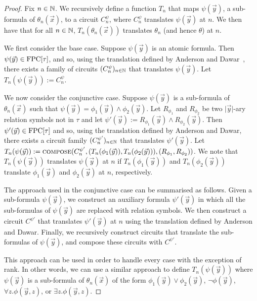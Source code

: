 \documentclass[../paper.tex]{subfiles}
\begin{document}
\begin{proof}
  Fix $n \in \mathbb{N}$. We recursively define a function $T_n$ that maps $\psi
  (\vec{y})$, a sub-formula of $\theta_n(\vec{x})$, to a circuit $C^{\psi}_n$,
  where $C^{\psi}_n$ translates $\psi(\vec{y})$ at $n$. We then have that for
  all $n \in \mathbb{N}$, $T_n(\theta_n(\vec{x}))$ translates $\theta_n$ (and hence
  $\theta$) at $n$.

  
  

  We first consider the base case. Suppose $\psi(\vec{y})$ is an atomic formula.
  Then $\psi(\vec{y}) \in \text{\upshape FPC}[\tau]$, and so, using the translation defined by
  Anderson and Dawar~\cite{AndersonD17}, there exists a family of circuits
  $(C^{\psi}_n)_{n \in \mathbb{N}}$ that translates $\psi(\vec{y})$. Let
  $T_n(\psi(\vec{y})) := C^{\psi}_n$.

  We now consider the conjunctive case. Suppose $\psi(\vec{y})$ is a sub-formula
  of $\theta_n(\vec{x})$ such that $\psi (\vec{y}) = \phi_1(\vec{y}) \land
  \phi_2(\vec{y})$. Let $R_{\phi_1}$ and $R_{\phi_2}$ be two $\vert \vec{y}
  \vert$-ary relation symbols not in $\tau$ and let $\psi' (\vec{y}) :=
  R_{\phi_1}(\vec{y}) \land R_{\phi_2}(\vec{y})$. Then $\psi'(\vec{y}) \in
  \text{\upshape FPC}[\tau]$ and so, using the translation defined by Anderson and Dawar, there
  exists a circuit family $(C^{\psi'}_n)_{n \in \mathbb{N}}$ that translates
  $\psi'(\vec{y})$. Let $T_n(\psi (\vec{y})) := {\normalfont\textsc{compose}}(C^{\psi'}_n, (
  T_n(\phi_1(\vec{y})), T_n(\phi_2(\vec{y}))), (R_{\phi_1}, R_{\phi_2}))$. We
  note that $T_n(\psi(\vec{y}))$ translates $\psi (\vec{y})$ at $n$ if
  $T_n(\phi_1 (\vec{y}))$ and $T_n(\phi_2(\vec{y}))$ translate $\phi_1(\vec{y})$
  and $\phi_2(\vec{y})$ at $n$, respectively.

  The approach used in the conjunctive case can be summarised as follows. Given
  a sub-formula $\psi (\vec{y})$, we construct an auxiliary formula
  $\psi'(\vec{y})$ in which all the sub-formulas of $\psi(\vec{y})$ are replaced
  with relation symbols. We then construct a circuit $C^{\psi'}$ that translates
  $\psi'(\vec{y})$ at $n$ using the translation defined by Anderson and Dawar.
  Finally, we recursively construct circuits that translate the sub-formulas of
  $\psi(\vec{y})$, and compose these circuits with $C^{\psi'}$.
  
  This approach can be used in order to handle every case with the exception of
  rank. In other words, we can use a similar approach to define
  $T_n(\psi(\vec{y}))$ where $\psi(\vec{y})$ is a sub-formula of
  $\theta_n(\vec{x})$ of the form $\phi_1(\vec{y}) \lor \phi_2(\vec{y})$, $\neg
  \phi(\vec{y})$, $\forall z. \phi (\vec{y}, z)$, or $\exists z. \phi (\vec{y},
  z)$.


\end{proof}
\end{document}
